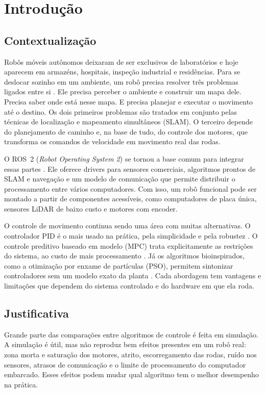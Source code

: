 \chapter[Introdução]{Introdução}
\label{cap:introducao}

\section{Contextualização}

Robôs móveis autônomos deixaram de ser exclusivos de laboratórios e hoje
aparecem em armazéns, hospitais, inspeção industrial e residências. Para
se deslocar sozinho em um ambiente, um robô precisa resolver três
problemas ligados entre si \cite{siegwart2011}. Ele precisa perceber o
ambiente e construir um mapa dele. Precisa saber onde está nesse mapa. E
precisa planejar e executar o movimento até o destino. Os dois primeiros
problemas são tratados em conjunto pelas técnicas de localização e
mapeamento simultâneos (SLAM). O terceiro depende do planejamento de
caminho e, na base de tudo, do controle dos motores, que transforma os
comandos de velocidade em movimento real das rodas.

O ROS~2 (\textit{Robot Operating System 2}) se tornou a base comum para
integrar essas partes \cite{macenski2022ros2}. Ele oferece drivers para
sensores comerciais, algoritmos prontos de SLAM e navegação e um modelo
de comunicação que permite distribuir o processamento entre vários
computadores. Com isso, um robô funcional pode ser montado a partir de
componentes acessíveis, como computadores de placa única, sensores LiDAR
de baixo custo e motores com encoder.

O controle de movimento continua sendo uma área com muitas alternativas.
O controlador PID é o mais usado na prática, pela simplicidade e pela
robustez \cite{astrom2006}. O controle preditivo baseado em modelo (MPC)
trata explicitamente as restrições do sistema, ao custo de mais
processamento \cite{camacho2007}. Já os algoritmos bioinspirados, como a
otimização por enxame de partículas (PSO), permitem sintonizar
controladores sem um modelo exato da planta \cite{kennedy1995pso}. Cada
abordagem tem vantagens e limitações que dependem do sistema controlado e
do hardware em que ela roda.

\section{Justificativa}

Grande parte das comparações entre algoritmos de controle é feita em
simulação. A simulação é útil, mas não reproduz bem efeitos presentes em
um robô real: zona morta e saturação dos motores, atrito, escorregamento
das rodas, ruído nos sensores, atrasos de comunicação e o limite de
processamento do computador embarcado. Esses efeitos podem mudar qual
algoritmo tem o melhor desempenho na prática.

